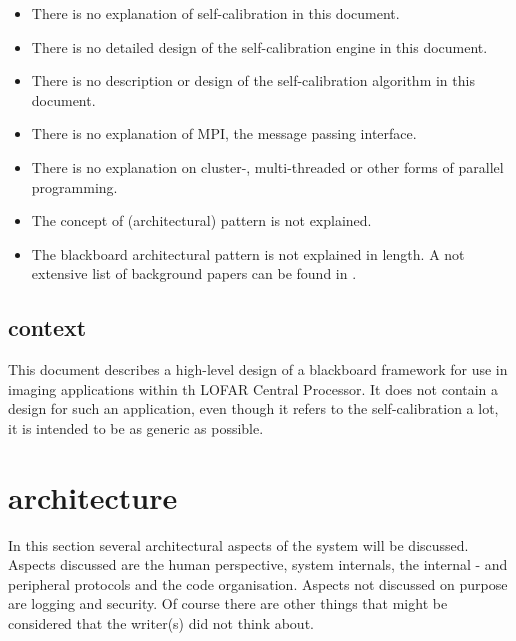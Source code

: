 \documentclass[]{lofar}
\begin{document}
        \begin{itemize}

          \item There is no explanation of self-calibration in this
            document.

          \item There is no detailed design of the self-calibration
            engine in this document.

          \item There is no description or design of the
            self-calibration algorithm in this document.

          \item There is no explanation of MPI, the message passing
            interface.

          \item There is no explanation on cluster-, multi-threaded or
            other forms of parallel programming.

          \item The concept of (architectural) pattern is not
            explained.

          \item The blackboard architectural pattern is not explained
            in length. A not extensive list of background papers can
            be found in \cite{bib:LOFAR-ASTRON-MEM-096}.

        \end{itemize}

    \subsection{context}
    \label{subsec:context}\hypertarget{subsec:context}{}

      This document describes a high-level design of a blackboard
      framework for use in imaging applications within th LOFAR Central
      Processor. It does not contain a design for such an application,
      even though it refers to the self-calibration a lot, it is
      intended to be as generic as possible.

  \section{architecture}
  \label{sec:architecture}\hypertarget{sec:architecture}{}

    In this section several architectural aspects of the system will
    be discussed. Aspects discussed are the human perspective, system
    internals, the internal - and peripheral protocols and the code
    organisation. Aspects not discussed on purpose are logging and
    security. Of course there are other things that might be
    considered that the writer(s) did not think about.
\end{document}

